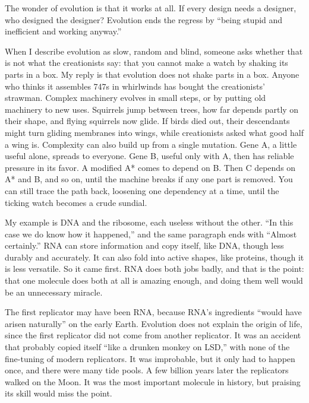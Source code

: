 
The wonder of evolution is that it works at all. If every design needs a designer, who designed the designer? Evolution ends the regress by ``being stupid and inefficient and working anyway.''

When I describe evolution as slow, random and blind, someone asks whether that is not what the creationists say: that you cannot make a watch by shaking its parts in a box. My reply is that evolution does not shake parts in a box. Anyone who thinks it assembles 747s in whirlwinds has bought the creationists' strawman. Complex machinery evolves in small steps, or by putting old machinery to new uses. Squirrels jump between trees, how far depends partly on their shape, and flying squirrels now glide. If birds died out, their descendants might turn gliding membranes into wings, while creationists asked what good half a wing is. Complexity can also build up from a single mutation. Gene A, a little useful alone, spreads to everyone. Gene B, useful only with A, then has reliable pressure in its favor. A modified A* comes to depend on B. Then C depends on A* and B, and so on, until the machine breaks if any one part is removed. You can still trace the path back, loosening one dependency at a time, until the ticking watch becomes a crude sundial. 

My example is DNA and the ribosome, each useless without the other. ``In this case we do know how it happened,'' and the same paragraph ends with ``Almost certainly.'' RNA can store information and copy itself, like DNA, though less durably and accurately. It can also fold into active shapes, like proteins, though it is less versatile. So it came first.  RNA does both jobs badly, and that is the point: that one molecule does both at all is amazing enough, and doing them well would be an unnecessary miracle.

The first replicator may have been RNA, because RNA's ingredients ``would have arisen naturally'' on the early Earth.  Evolution does not explain the origin of life, since the first replicator did not come from another replicator. It was an accident that probably copied itself ``like a drunken monkey on LSD,'' with none of the fine-tuning of modern replicators. It was improbable, but it only had to happen once, and there were many tide pools. A few billion years later the replicators walked on the Moon. It was the most important molecule in history, but praising its skill would miss the point.

